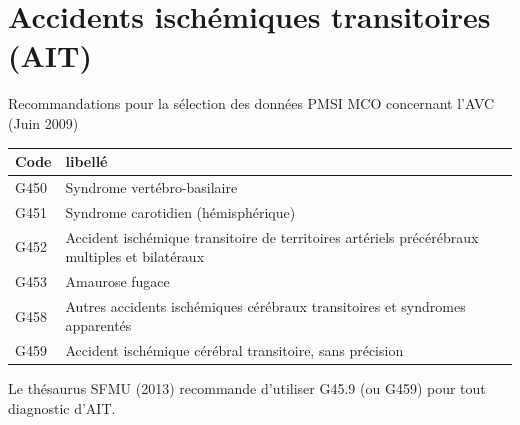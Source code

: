 \documentclass[12pt,english,french,twoside]{book}\usepackage[]{graphicx}\usepackage[]{color}
\begin{document}
\section{Accidents ischémiques transitoires (AIT)}

Recommandations pour la sélection des données PMSI MCO concernant l’AVC (Juin 2009)

{\small
\begin{longtable}{|l|l|}
 \hline
 Code & libellé\\
 \hline
G450 & Syndrome vertébro-basilaire \\
G451 & Syndrome carotidien (hémisphérique) \\
G452 & Accident ischémique transitoire de territoires artériels précérébraux multiples et bilatéraux \\
G453  & Amaurose fugace \\
G458  & Autres accidents ischémiques cérébraux transitoires et syndromes apparentés \\
G459  & Accident ischémique cérébral transitoire, sans précision \\  
  \hline
\end{longtable}
} %

Le thésaurus SFMU (2013) \cite{9} recommande d'utiliser G45.9 (ou G459) pour tout diagnostic d'AIT.
\end{document}
